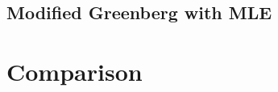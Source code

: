 \documentclass[12pt,a4paper]{report}
\begin{document}
\section{Modified Greenberg with MLE}

\chapter{Comparison}

\end{document}

